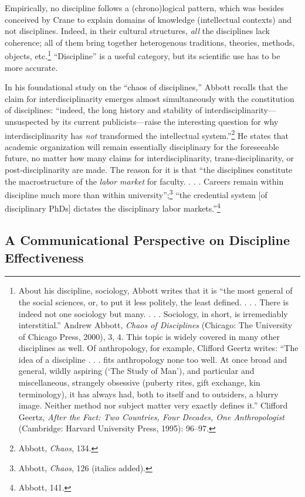 \documentclass{tufte-handout}
\begin{document}
\noindent Empirically, no discipline follows a (chrono)logical pattern, which was
besides conceived by Crane to explain domains of knowledge (intellectual
contexts) and not disciplines. Indeed, in their cultural structures,
\emph{all} the disciplines lack coherence; all of them bring together
heterogenous traditions, theories, methods, objects, etc.\footnote{About
  his discipline, sociology, Abbott writes that it is ``the most general
  of the social sciences, or, to put it less politely, the least
  defined. . . . There is indeed not one sociology but many. . . .
  Sociology, in short, is irremediably interstitial.'' Andrew Abbott,
  \emph{Chaos of Disciplines} (Chicago: The University of Chicago Press,
  2000), 3, 4. This topic is widely covered in many other disciplines as
  well. Of anthropology, for example, Clifford Geertz writes: ``The idea
  of a discipline . . . fits anthropology none too well. At once broad
  and general, wildly aspiring (`The Study of Man'), and particular and
  miscellaneous, strangely obsessive (puberty rites, gift exchange, kin
  terminology), it has always had, both to itself and to outsiders, a
  blurry image. Neither method nor subject matter very exactly defines
  it.'' Clifford Geertz, \emph{After the Fact: Two Countries, Four
  Decades, One Anthropologist} (Cambridge: Harvard University Press,
  1995): 96--97.} ``Discipline'' is a useful category, but its
scientific use has to be more accurate.

In his foundational study on the ``chaos of disciplines,'' Abbott
recalls that the claim for interdisciplinarity emerges almost
simultaneously with the constitution of disciplines: ``indeed, the long
history and stability of interdisciplinarity---unsuspected by its
current publicists---raise the interesting question for why
interdisciplinarity has \emph{not} transformed the intellectual
system.''\footnote{Abbott, \emph{Chaos}, 134.} He states that academic
organization will remain essentially disciplinary for the foreseeable
future, no matter how many claims for interdisciplinarity,
trans-disciplinarity, or post-disciplinarity are made. The reason for it
is that ``the disciplines constitute the macrostructure of the
\emph{labor market} for faculty. . . . Careers remain within discipline
much more than within university'';\footnote{Abbott, \emph{Chaos}, 126
  (italics added).} ``the credential system {[}of disciplinary PhDs{]}
dictates the disciplinary labor markets.''\footnote{Abbott, 141.}

\hypertarget{a-communicational-perspective-on-discipline-effectiveness}{%
\subsection{A Communicational Perspective on
Discipline
Effectiveness}\label{a-communicational-perspective-on-discipline-effectiveness}}
\end{document}

